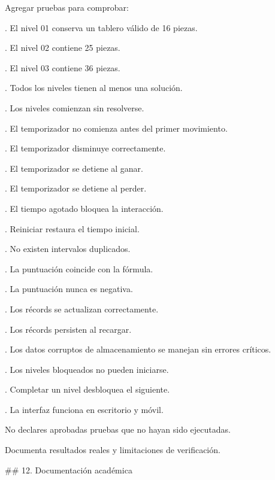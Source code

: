 \par\smallskip
\noindent Agregar pruebas para comprobar:\par
\par\smallskip
{}. El nivel 01 conserva un tablero válido de 16 piezas.\par
{}. El nivel 02 contiene 25 piezas.\par
{}. El nivel 03 contiene 36 piezas.\par
{}. Todos los niveles tienen al menos una solución.\par
{}. Los niveles comienzan sin resolverse.\par
{}. El temporizador no comienza antes del primer movimiento.\par
{}. El temporizador disminuye correctamente.\par
{}. El temporizador se detiene al ganar.\par
{}. El temporizador se detiene al perder.\par
{}. El tiempo agotado bloquea la interacción.\par
{}. Reiniciar restaura el tiempo inicial.\par
{}. No existen intervalos duplicados.\par
{}. La puntuación coincide con la fórmula.\par
{}. La puntuación nunca es negativa.\par
{}. Los récords se actualizan correctamente.\par
{}. Los récords persisten al recargar.\par
{}. Los datos corruptos de almacenamiento se manejan sin errores críticos.\par
{}. Los niveles bloqueados no pueden iniciarse.\par
{}. Completar un nivel desbloquea el siguiente.\par
{}. La interfaz funciona en escritorio y móvil.\par
\par\smallskip
\noindent No declares aprobadas pruebas que no hayan sido ejecutadas.\par
\par\smallskip
\noindent Documenta resultados reales y limitaciones de verificación.\par
\par\smallskip
\noindent \#\# 12. Documentación académica\par
